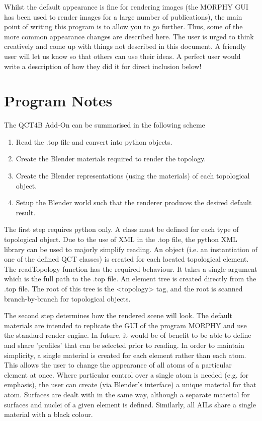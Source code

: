 \documentclass{report}
\begin{document}
Whilst the default appearance is fine for rendering images (the MORPHY GUI has been used to render images for a large number of publications), the main point of writing this program is to allow you to go further.
Thus, some of the more common appearance changes are described here. 
The user is urged to think creatively and come up with things not described in this document.
A friendly user will let us know so that others can use their ideas.
A perfect user would write a description of how they did it for direct inclusion below!

\chapter{Program Notes}

The QCT4B Add-On can be summarised in the following scheme

\begin{enumerate}

  \item Read the .top file and convert into python objects.
  \item Create the Blender materials required to render the topology.
  \item Create the Blender representations (using the materials) of each topological object.
  \item Setup the Blender world such that the renderer produces the desired default result.

\end{enumerate}

The first step requires python only. A class must be defined for each type of topological object.
Due to the use of XML in the .top file, the python XML library can be used to majorly simplify reading.
An object (i.e. an instantiation of one of the defined QCT classes) is created for each located topological element.
The readTopology function has the required behaviour. It takes a single argument which is the full path to the .top file.
An element tree is created directly from the .top file. The root of this tree is the <topology> tag, and the root is scanned branch-by-branch for topological objects.


The second step determines how the rendered scene will look.
The default materials are intended to replicate the GUI of the program MORPHY and use the standard render engine.
In future, it would be of benefit to be able to define and share 'profiles' that can be selected prior to reading.
In order to maintain simplicity, a single material is created for each element rather than each atom.
This allows the user to change the appearance of all atoms of a particular element at once.
Where particular control over a single atom is needed (e.g. for emphasis), the user can create (via Blender's interface) a unique material for that atom.
Surfaces are dealt with in the same way, although a separate material for surfaces and nuclei of a given element is defined.
Similarly, all AILs share a single material with a black colour.
\end{document}
